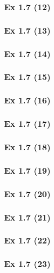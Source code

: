 \subsubsection{Ex 1.7 (12)}\label{sec:Ex_1.7.12}

\subsubsection{Ex 1.7 (13)}\label{sec:Ex_1.7.13}

\subsubsection{Ex 1.7 (14)}\label{sec:Ex_1.7.14}

\subsubsection{Ex 1.7 (15)}\label{sec:Ex_1.7.15}

\subsubsection{Ex 1.7 (16)}\label{sec:Ex_1.7.16}

\subsubsection{Ex 1.7 (17)}\label{sec:Ex_1.7.17}

\subsubsection{Ex 1.7 (18)}\label{sec:Ex_1.7.18}

\subsubsection{Ex 1.7 (19)}\label{sec:Ex_1.7.19}

\subsubsection{Ex 1.7 (20)}\label{sec:Ex_1.7.20}

\newpage		%

\subsubsection{Ex 1.7 (21)}\label{sec:Ex_1.7.21}

\subsubsection{Ex 1.7 (22)}\label{sec:Ex_1.7.22}

\subsubsection{Ex 1.7 (23)}\label{sec:Ex_1.7.23}


